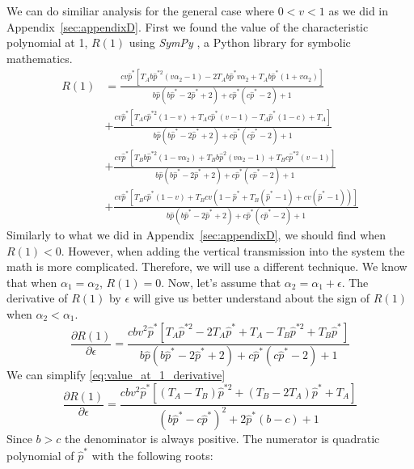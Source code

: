\documentclass[12pt]{extarticle}
\begin{document}
We can do similiar analysis for the general case where $0<v<1$ as we did in Appendix~\ref{sec:appendixD}.
First we found the value of the characteristic polynomial at 1, $R(1)$ using \emph{SymPy} \citep{Meurer2017}, a Python library for symbolic mathematics.
\begin{equation} \label{eq:value_at_1}
  \begin{aligned}
  R(1) &= \frac{c v \hat{p}^*[T_Ab\hat{p}^{*2}(v\alpha_2-1)-2T_Ab\hat{p}^*v\alpha_2 + T_Ab\hat{p}^*(1+v\alpha_2)]}{b\hat{p}(b\hat{p}^*-2\hat{p}^*+2)+c\hat{p}^*(c\hat{p}^*-2)+1} \\
 & + \frac{c v \hat{p}^*[T_Ac\hat{p}^{*2}(1-v)+T_Ac\hat{p}^*(v-1)-T_A\hat{p}^*(1-c)+T_A]}{b\hat{p}(b\hat{p}^*-2\hat{p}^*+2)+c\hat{p}^*(c\hat{p}^*-2)+1} \\
  &+ \frac{c v \hat{p}^*[T_Bb\hat{p}^{*2}(1-v\alpha_2)+T_Bb\hat{p}^2(v\alpha_2-1)+T_Bc\hat{p}^{*2}(v-1)]}{b\hat{p}(b\hat{p}^*-2\hat{p}^*+2)+c\hat{p}^*(c\hat{p}^*-2)+1}\\
  &+ \frac{c v \hat{p}^*[T_Bc\hat{p}^*(1-v) + T_Bcv(1-\hat{p}^*+T_B(\hat{p}^*-1)+cv(\hat{p}^*-1))]}{b\hat{p}(b\hat{p}^*-2\hat{p}^*+2)+c\hat{p}^*(c\hat{p}^*-2)+1}
  \end{aligned}
\end{equation}
Similarly to what we did in Appendix~\ref{sec:appendixD}, we should find when $R(1)<0$. However, when adding the vertical transmission into the system the math is more complicated. 
Therefore, we will use a different technique. We know that when $\alpha_1 = \alpha_2$, $R(1)=0$. 
Now, let's assume that $\alpha_2 = \alpha_1 + \epsilon$. The derivative of $R(1)$ by $\epsilon$ will give us better understand about the sign of $R(1)$ when $\alpha_2<\alpha_1$.
\begin{equation} \label{eq:value_at_1_derivative}
  \frac{\partial R(1)}{\partial \epsilon} = \frac{c b  v^2 \hat{p}^*[T_A\hat{p}^{*2}-2T_A\hat{p}^* + T_A-T_B\hat{p}^{*2}+T_B\hat{p}^*]}{b\hat{p}(b\hat{p}^*-2\hat{p}^*+2)+c\hat{p}^*(c\hat{p}^*-2)+1} 
\end{equation}
We can simplify \autoref{eq:value_at_1_derivative}
\begin{equation} \label{eq:value_at_1_derivative_simplify}
  \frac{\partial R(1)}{\partial \epsilon} = \frac{c b v^2 \hat{p}^*[(T_A-T_B)\hat{p}^{*2}+(T_B-2T_A)\hat{p}^* + T_A]}{(b\hat{p}^*-c\hat{p}^*)^2+2\hat{p}^*(b-c)+1} 
\end{equation}
Since $b>c$ the denominator is always positive. The numerator is quadratic polynomial of $\hat{p}^*$ with the following roots:
\end{document}
